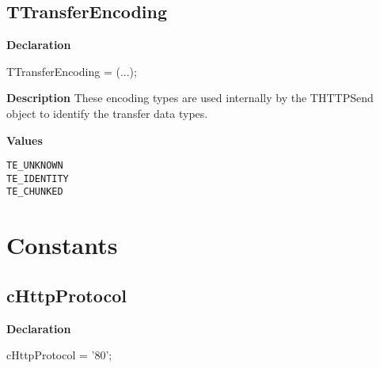 \documentclass{report}
\newif\ifpdf
\begin{document}
\subsection*{TTransferEncoding}
\fi
\label{httpsend-TTransferEncoding}
\begin{list}{}{
\setlength{\itemindent}{0cm}
\setlength{\listparindent}{0cm}
\setlength{\leftmargin}{\evensidemargin}
\addtolength{\leftmargin}{\tmplength}
\settowidth{\labelsep}{X}
\addtolength{\leftmargin}{\labelsep}
\setlength{\labelwidth}{\tmplength}
}
\item[\textbf{Declaration}\hfill]
\ifpdf
\begin{flushleft}
\fi
\begin{ttfamily}
TTransferEncoding = (...);\end{ttfamily}

\ifpdf
\end{flushleft}
\fi

\par
\item[\textbf{Description}]
These encoding types are used internally by the THTTPSend object to identify the transfer data types.\item[\textbf{Values}]
\begin{description}
\item[\texttt{TE{\_}UNKNOWN}]  
\item[\texttt{TE{\_}IDENTITY}]  
\item[\texttt{TE{\_}CHUNKED}]  
\end{description}


\end{list}
\section{Constants}
\ifpdf
\subsection*{\large{\textbf{cHttpProtocol}}\normalsize\hspace{1ex}\hrulefill}
\else
\subsection*{cHttpProtocol}
\fi
\label{httpsend-cHttpProtocol}
\begin{list}{}{
\setlength{\itemindent}{0cm}
\setlength{\listparindent}{0cm}
\setlength{\leftmargin}{\evensidemargin}
\addtolength{\leftmargin}{\tmplength}
\settowidth{\labelsep}{X}
\addtolength{\leftmargin}{\labelsep}
\setlength{\labelwidth}{\tmplength}
}
\item[\textbf{Declaration}\hfill]
\ifpdf
\begin{flushleft}
\fi
\begin{ttfamily}
cHttpProtocol = '80';\end{ttfamily}

\ifpdf
\end{flushleft}
\fi

\end{list}
\end{document}
